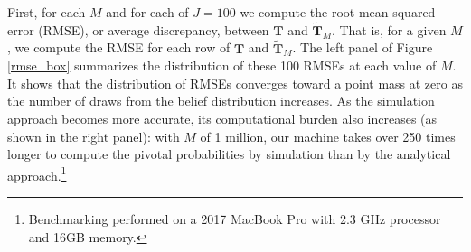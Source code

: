 \documentclass[11pt,a4paper]{article}
\begin{document}
First, for each $M$ and for each of $J=100$ we compute the root mean squared error (RMSE), or average discrepancy, between $\mathbf{T}$ and $\mathbf{\tilde{T}}_M$. That is, for a given $M$, we compute the RMSE for each row of $\mathbf{T}$ and $\mathbf{\tilde{T}}_M$. 
 The left panel of Figure \ref{rmse_box} summarizes the distribution of these 100 RMSEs at each value of $M$. It shows that the distribution of RMSEs converges toward a point mass at zero as the number of draws from the belief distribution increases. %
As the simulation approach becomes more accurate, its computational burden also increases (as shown in the right panel): with $M$ of 1 million, our machine takes over 250 times longer to compute the pivotal probabilities by simulation than by the analytical approach.\footnote{Benchmarking performed on a 2017 MacBook Pro with 2.3 GHz processor and 16GB memory.} 


\end{document}
